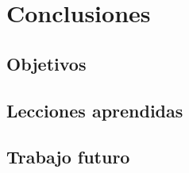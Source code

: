 \chapter{Conclusiones}

\section{Objetivos}

\section{Lecciones aprendidas}

\section{Trabajo futuro}